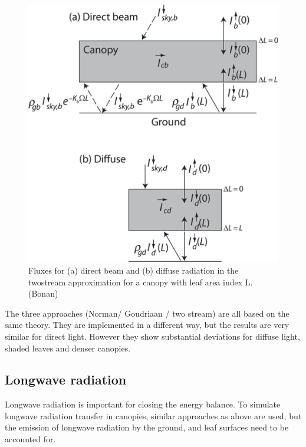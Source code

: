 \documentclass[12pt,oneside]{book}
\begin{document}
\begin{figure}

{\centering \includegraphics[width=0.8\linewidth]{figures/chap3/f321_two_stream} 

}

\caption{Fluxes for (a) direct beam and (b) diffuse radiation in the twostream approximation for a canopy with leaf area index L.(Bonan)}\label{fig:f321}
\end{figure}

The three approaches (Norman/ Goudriaan / two stream) are all based on
the same theory. They are implemented in a different way, but the
results are very similar for direct light. However they show substantial
deviations for diffuse light, shaded leaves and denser canopies.

\subsection{Longwave radiation}\label{longwave-radiation}

Longwave radiation is important for closing the energy balance. To
simulate longwave radiation transfer in canopies, similar approaches as
above are used, but the emission of longwave radiation by the ground,
and leaf surfaces need to be accounted for.
\end{document}
